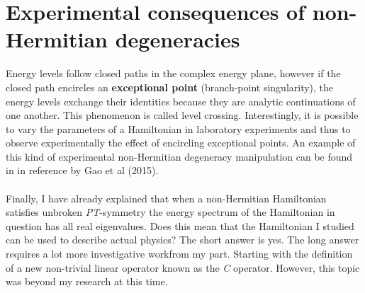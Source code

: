 \documentclass[10pt, a4paper, singlespacing]{report}
\newcommand\PT{\emph{PT}}
\begin{document}
\section{Experimental consequences of non-Hermitian degeneracies}\label{Experimental}

Energy levels follow closed paths in the complex energy plane, however if the closed path encircles an \textbf{exceptional point} (branch-point singularity), the energy levels exchange their identities because they are analytic continuations of one another\cite{BenderPT}\cite{Bender2017}. This phenomenon is called level crossing. Interestingly, it is possible to vary the parameters of a Hamiltonian in laboratory experiments and thus to observe experimentally the effect of encircling exceptional points\cite{Bender2017}. An example of this kind of experimental non-Hermitian degeneracy manipulation can be found in in reference \cite{Ostrovskaya} by Gao et al (2015).\\\\

Finally, I have already explained that when a non-Hermitian Hamiltonian satisfies unbroken \PT-symmetry the energy spectrum of the Hamiltonian in question has all real eigenvalues.
Does this mean that the Hamiltonian I studied can be used to describe actual physics? The short answer is yes. The long answer requires a lot more investigative workfrom my part. Starting with the definition of a new non-trivial linear operator known as the \emph{C} operator. However, this topic was beyond my research at this time. 

\end{document}
